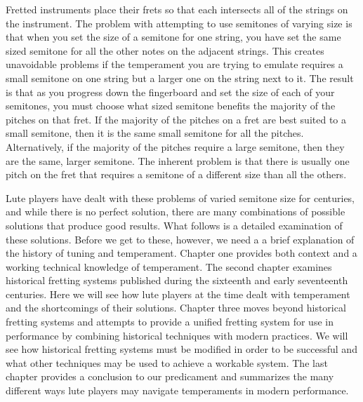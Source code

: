 Fretted instruments place their frets so that each intersects all of the strings on the instrument. The problem with
attempting to use semitones of varying size is that when you set the size of a semitone for one string, you have set the
same sized semitone for all the other notes on the adjacent strings. This creates unavoidable problems if the
temperament you are trying to emulate requires a small semitone on one string but a larger one on the string next to it.
The result is that as you progress down the fingerboard and set the size of each of your semitones, you must choose what
sized semitone benefits the majority of the pitches on that fret. If the majority of the pitches on a fret are best
suited to a small semitone, then it is the same small semitone for all the pitches. Alternatively, if the majority of
the pitches require a large semitone, then they are the same, larger semitone. The inherent problem is that there is
usually one pitch on the fret that requires a semitone of a different size than all the others.

Lute players have dealt with these problems of varied semitone size for centuries, and while there is no perfect
solution, there are many combinations of possible solutions that produce good results. What follows is a detailed
examination of these solutions. Before we get to these, however, we need a a brief explanation of the history of tuning
and temperament. Chapter one provides both context and a working technical knowledge of temperament. The second chapter
examines historical fretting systems published during the sixteenth and early seventeenth centuries. Here we will see
how lute players at the time dealt with temperament and the shortcomings of their solutions. Chapter three moves beyond
historical fretting systems and attempts to provide a unified fretting system for use in performance by combining
historical techniques with modern practices. We will see how historical fretting systems must be modified in order to
be successful and what other techniques may be used to achieve a workable system. The last chapter provides a conclusion
to our predicament and summarizes the many different ways lute players may navigate temperaments in modern
performance.
